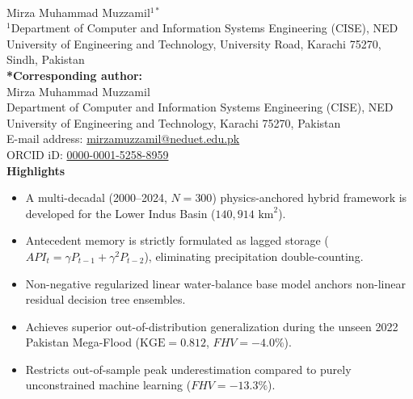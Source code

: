 \documentclass[11pt,a4paper,fleqn]{article}
\begin{document}
\pagestyle{plain}
\thispagestyle{plain}


\begin{singlespace}
\\[1.5em]

\noindent Mirza Muhammad Muzzamil$^{1*}$\\[0.8em]

\noindent $^1$Department of Computer and Information Systems Engineering (CISE), NED University of Engineering and Technology, University Road, Karachi 75270, Sindh, Pakistan\\[1.2em]

\noindent \textbf{*Corresponding author:}\\
\noindent Mirza Muhammad Muzzamil\\
\noindent Department of Computer and Information Systems Engineering (CISE), NED University of Engineering and Technology, Karachi 75270, Pakistan\\
\noindent E-mail address: \href{mailto:mirzamuzzamil@neduet.edu.pk}{mirzamuzzamil@neduet.edu.pk}\\
\noindent ORCID iD: \href{https://orcid.org/0000-0001-5258-8959}{0000-0001-5258-8959}\\[1.5em]

\noindent \textbf{Highlights}
\begin{itemize}
    \item A multi-decadal (2000--2024, $N=300$) physics-anchored hybrid framework is developed for the Lower Indus Basin ($140,914\text{ km}^2$).
    \item Antecedent memory is strictly formulated as lagged storage ($API_t = \gamma P_{t-1} + \gamma^2 P_{t-2}$), eliminating precipitation double-counting.
    \item Non-negative regularized linear water-balance base model anchors non-linear residual decision tree ensembles.
    \item Achieves superior out-of-distribution generalization during the unseen 2022 Pakistan Mega-Flood ($\text{KGE} = 0.812$, $FHV = -4.0\%$).
    \item Restricts out-of-sample peak underestimation compared to purely unconstrained machine learning ($FHV = -13.3\%$).
\end{itemize}
\vspace{1.0em}


\end{singlespace}
\end{document}
